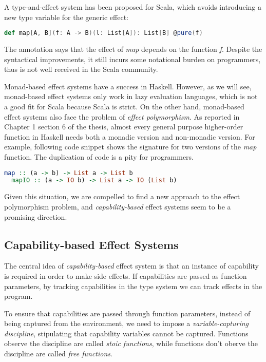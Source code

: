 A type-and-effect system has been proposed for
Scala\cite{lukas2014effect}, which avoids introducing a new type
variable for the generic effect:

\begin{lstlisting}[language=Scala]
def map[A, B](f: A -> B)(l: List[A]): List[B] @pure(f)
\end{lstlisting}

The annotation says that the effect of \emph{map} depends on the
function \emph{f}. Despite the syntactical improvements, it still
incurs some notational burden on programmers, thus is not well
received in the Scala community.

Monad-based effect systems have a success in Haskell. However, as we
will see, monad-based effect systems only work in lazy evaluation
languages, which is not a good fit for Scala because Scala is
strict. On the other hand, monad-based effect systems also face the
problem of \emph{effect polymorphism}. As reported in Chapter 1
section 6 of the thesis\cite{lippmeier2009type}, almost every general
purpose higher-order function in Haskell needs both a monadic version
and non-monadic version. For example, following code snippet shows the
signature for two versions of the \emph{map} function. The duplication
of code is a pity for programmers.

\begin{lstlisting}[language=Haskell]
  map :: (a -> b) -> List a -> List b
  mapIO :: (a -> IO b) -> List a -> IO (List b)
\end{lstlisting}

Given this situation, we are compelled to find a new approach to the
effect polymorphism problem, and \emph{capability-based} effect
systems seem to be a promising direction.

\subsection{Capability-based Effect Systems}

The central idea of \emph{capability-based} effect system is that an
instance of capability is required in order to make side effects. If
capabilities are passed as function parameters, by tracking
capabilities in the type system we can track effects in the program.

To ensure that capabilities are passed through function parameters,
instead of being captured from the environment, we need to impose a
\emph{variable-capturing discipline}, stipulating that capability
variables cannot be captured. Functions observe the discipline are
called \emph{stoic functions}, while functions don't oberve the
discipline are called \emph{free functions}.

